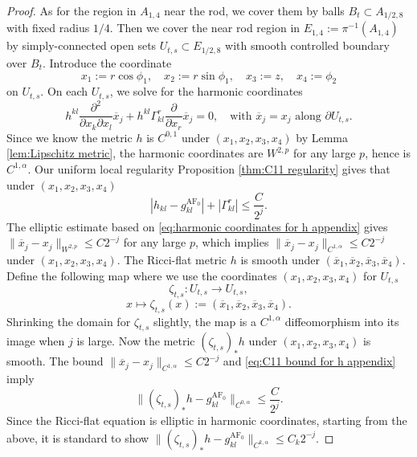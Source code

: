 \documentclass[10pt,a4paper]{amsart}
\DeclareMathOperator{\AF}{AF}
\begin{document}
\begin{proof}
    
    
    As for the region in $A_{1,4}$ near the rod, we cover them by balls $B_t\subset A_{1/2,8}$ with fixed radius $1/4$. Then we cover the near rod region in $E_{1,4}:=\pi^{-1}(A_{1,4})$ by simply-connected open sets $U_{t,s}\subset E_{1/2,8}$ with smooth controlled boundary over $B_t$.  Introduce the coordinate
    $$x_1:=r\cos\phi_1,\quad x_2:=r\sin\phi_1,\quad x_3:=z,\quad x_4:=\phi_2$$
    on $U_{t,s}$. On each $U_{t,s}$, we solve for the harmonic coordinates
    \begin{equation}
        {h}^{kl}\frac{\partial^2}{\partial x_k\partial x_l}\overline{x}_j+{h}^{kl}{\Gamma}^r_{kl}\frac{\partial}{\partial x_r}\overline{x}_j=0,\quad \text{with }\overline{x}_j=x_j\text{ along }\partial U_{t,s}.\label{eq:harmonic coordinates for h appendix}
    \end{equation}
    Since we know the metric $h$ is $C^{0,1}$ under $(x_1,x_2,x_3,x_4)$ by Lemma \ref{lem:Lipschitz metric}, the harmonic coordinates are $W^{2,p}$ for any large $p$, hence is $C^{1,\alpha}$. Our uniform local regularity Proposition \ref{thm:C11 regularity} gives that under $(x_1,x_2,x_3,x_4)$
    \begin{equation}\label{eq:C11 bound for h appendix}
        |h_{kl}-g^{\AF_0}_{kl}|+|\Gamma^r_{kl}|\leq\frac{C}{2^j}.
    \end{equation}
    The elliptic estimate based on \eqref{eq:harmonic coordinates for h appendix} gives $\|\overline{x}_j-x_j\|_{W^{2,p}}\leq C2^{-j}$ for any large $p$, which implies $\|\overline{x}_j-x_j\|_{C^{1,\alpha}}\leq C2^{-j}$ under $(x_1,x_2,x_3,x_4)$. The Ricci-flat metric $h$ is smooth under $(\overline{x}_1,\overline{x}_2,\overline{x}_3,\overline{x}_4)$. Define the following map where we use the coordinates $(x_1,x_2,x_3,x_4)$ for $U_{t,s}$
    $$\zeta_{t,s}:U_{t,s}\to U_{t,s},$$
    $$x\mapsto \zeta_{t,s}(x):=(\overline{x}_1,\overline{x}_2,\overline{x}_3,\overline{x}_4).$$
    Shrinking the domain for $\zeta_{t,s}$ slightly, the map is a $C^{1,\alpha}$ diffeomorphism into its image when $j$ is large. Now the metric $(\zeta_{t,s})_*h$ under $(x_1,x_2,x_3,x_4)$ is smooth. The bound $\|\overline{x}_j-x_j\|_{C^{1,\alpha}}\leq C2^{-j}$ and \eqref{eq:C11 bound for h appendix} imply
    $$\|(\zeta_{t,s})_*h-g^{\AF_0}_{kl}\|_{C^{0,\alpha}}\leq \frac{C}{2^j}.$$
    Since the Ricci-flat equation is elliptic in harmonic coordinates, starting from the above, it is standard to show $\|(\zeta_{t,s})_*h-g^{\AF_0}_{kl}\|_{C^{k,\alpha}}\leq C_k2^{-j}$.





\end{proof}
\end{document}
